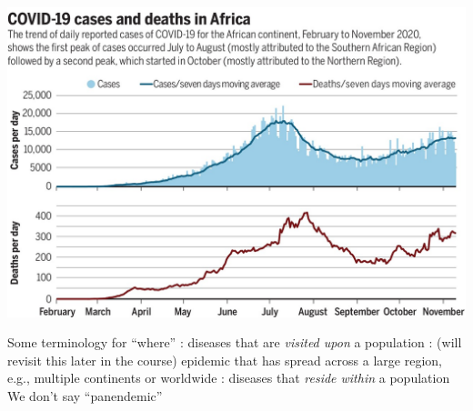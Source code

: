\documentclass[aspectratio=169]{beamer}\usepackage[]{graphicx}\usepackage[]{xcolor}
\begin{document}
\begin{frame}
    \includegraphics[width=\textwidth]{FIGS/371_27_f1.jpeg}
\end{frame}


\begin{frame}{Some terminology for ``where''}
\bbullet {}: diseases that are \emph{visited upon} a population
\vfill
\bbullet {}: (will revisit this later in the course) epidemic that has spread across a large region, e.g., multiple continents or worldwide
\vfill
\bbullet {}: diseases that \emph{reside within} a population
\vfill
\bbullet We don't say ``panendemic''
\end{frame}
\end{document}
